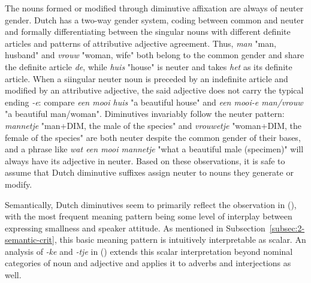 The nouns formed or modified through diminutive affixation are always of neuter gender. Dutch has a two-way gender system, coding between common and neuter and formally differentiating between the singular nouns with different definite articles and patterns of attributive adjective agreement. Thus, \textit{man} "man, husband" and \textit{vrouw} "woman, wife" both belong to the common gender and share the definite article \textit{de}, while \textit{huis} "house" is neuter and takes \textit{het} as its definite article. When a siingular neuter noun is preceded by an indefinite article and modified by an attributive adjective, the said adjective does not carry the typical ending \textit{-e}: compare \textit{een mooi huis} "a beautiful house" and \textit{een mooi-e man/vrouw} "a beautiful man/woman". Diminutives invariably follow the neuter pattern: \textit{mannetje} "man+DIM, the male of the species" and \textit{vrouwetje} "woman+DIM, the female of the species" are both neuter despite the common gender of their bases, and a phrase like \textit{wat een mooi mannetje} "what a beautiful male (specimen)" will always have its adjective in neuter. Based on these observations, it is safe to assume that Dutch diminutive suffixes assign neuter to nouns they generate or modify.

Semantically, Dutch diminutives seem to primarily reflect the observation in \citeauthor{Schneider+2003} (\citeyear{Schneider+2003}), with the most frequent meaning pattern being some level of interplay between expressing smallness and speaker attitude. As mentioned in Subsection~\ref{subsec:2-semantic-crit}, this basic meaning pattern is intuitively interpretable as scalar. An analysis of \textit{-ke} and \textit{-tje} in \citeauthor{DeBelder+2022} (\citeyear{DeBelder+2022}) extends this scalar interpretation beyond nominal categories of noun and adjective and applies it to adverbs and interjections as well.

